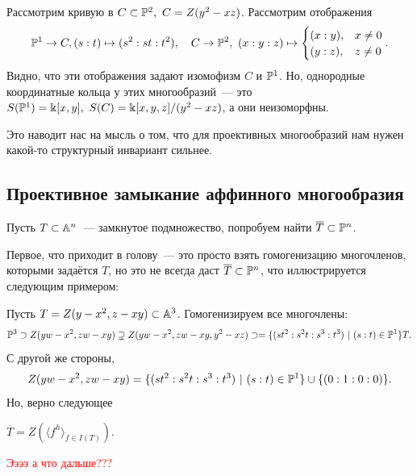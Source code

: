 	\begin{example}
		Рассмотрим кривую в $C \subset \PP^2, \ C = Z(y^2 - xz)$. Рассмотрим отображения
		\[
			\PP^1 \to C,  (s : t) \mapsto (s^2 : st : t^2), \quad C \to \PP^2, \ (x : y : z) \mapsto \begin{cases} (x : y), & x \neq 0 \\ (y : z), & z \neq 0 \end{cases}.
		\]
		Видно, что эти отображения задают изомофизм $C$ и $\PP^1$. Но, однородные координатные кольца у этих многообразий~--- это $S(\PP^1) = \bk[x, y], \ S(C) = \bk[x, y, z]/(y^2 - xz)$, а они неизоморфны. 

		Это наводит нас на мысль о том, что для проективных многообразий нам нужен какой-то структурный инвариант сильнее. 
	\end{example}

	\subsection{Проективное замыкание аффинного многообразия}

	Пусть $T \subset \AA^n$~--- замкнутое подмножество, попробуем найти $\overline{T} \subset \PP^n$. 

	Первое, что приходит в голову~--- это просто взять гомогенизацию многочленов, которыми задаётся $T$, но это не всегда даст $\overline{T} \subset \PP^n$, что иллюстрируется следующим примером: 

	\begin{example}
		Пусть $T = Z(y - x^2, z - xy) \subset \AA^3$. Гомогенизируем все многочлены:  
		\[
			\PP^3 \supset Z(yw - x^2, zw - xy) \supsetneq Z(yw - x^2, zw - xy, y^2 - xz) \supset = \{ (st^2 : s^2 t : s^3 : t^3) \ \vert \ (s : t) \in \PP^1 \} T
.		\]
		С другой же стороны, 
		\[
			Z(yw - x^2, zw - xy) = \{ (st^2 : s^2 t : s^3 : t^3) \ \vert \ (s : t) \in \PP^1 \} \cup \{ (0 : 1 : 0 : 0) \}.
		\]
		Но, верно следующее 
		\begin{exercise}
			$\overline{T} = Z(\langle f^h \rangle_{f \in I(T) })$.
		\end{exercise}


	\textcolor{red}{Ээээ а что дальше???}	
	\end{example}


